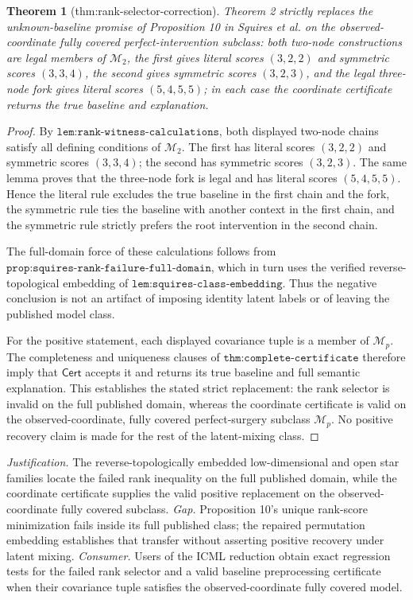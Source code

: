 \documentclass{article}
\newtheorem{theorem}{Theorem}
\begin{document}
\begin{theorem}[thm:rank-selector-correction]\label{thm:rank-selector-correction}
Theorem 2 strictly replaces the unknown-baseline promise of Proposition 10 in Squires et al. on the observed-coordinate fully covered perfect-intervention subclass: both two-node constructions are legal members of \(\mathcal M_2\), the first gives literal scores \((3,2,2)\) and symmetric scores \((3,3,4)\), the second gives symmetric scores \((3,2,3)\), and the legal three-node fork gives literal scores \((5,4,5,5)\); in each case the coordinate certificate returns the true baseline and explanation.
\end{theorem}
\begin{proof}
By \(\texttt{lem:rank-witness-calculations}\), both displayed two-node
chains satisfy all defining conditions of \(\mathcal M_2\).  The first
has literal scores \((3,2,2)\) and symmetric scores \((3,3,4)\); the
second has symmetric scores \((3,2,3)\).  The same lemma proves that the
three-node fork is legal and has literal scores \((5,4,5,5)\).  Hence the
literal rule excludes the true baseline in the first chain and the fork,
the symmetric rule ties the baseline with another context in the first
chain, and the symmetric rule strictly prefers the root intervention in
the second chain.

The full-domain force of these calculations follows from
\(\texttt{prop:squires-rank-failure-full-domain}\), which in turn uses the
verified reverse-topological embedding of
\(\texttt{lem:squires-class-embedding}\).  Thus the negative conclusion
is not an artifact of imposing identity latent labels or of leaving the
published model class.

For the positive statement, each displayed covariance tuple is a member
of \(\mathcal M_p\).  The completeness and uniqueness clauses of
\(\texttt{thm:complete-certificate}\) therefore imply that
\(\mathsf{Cert}\) accepts it and returns its true baseline and full
semantic explanation.  This establishes the stated strict replacement:
the rank selector is invalid on the full published domain, whereas the
coordinate certificate is valid on the observed-coordinate, fully covered
perfect-surgery subclass \(\mathcal M_p\).  No positive recovery claim is
made for the rest of the latent-mixing class.
\end{proof}
\par\smallskip\noindent \textit{Justification.} The reverse-topologically embedded low-dimensional and open star families locate the failed rank inequality on the full published domain, while the coordinate certificate supplies the valid positive replacement on the observed-coordinate fully covered subclass. \textit{Gap.} Proposition 10's unique rank-score minimization fails inside its full published class; the repaired permutation embedding establishes that transfer without asserting positive recovery under latent mixing. \textit{Consumer.} Users of the ICML reduction obtain exact regression tests for the failed rank selector and a valid baseline preprocessing certificate when their covariance tuple satisfies the observed-coordinate fully covered model.
\end{document}

